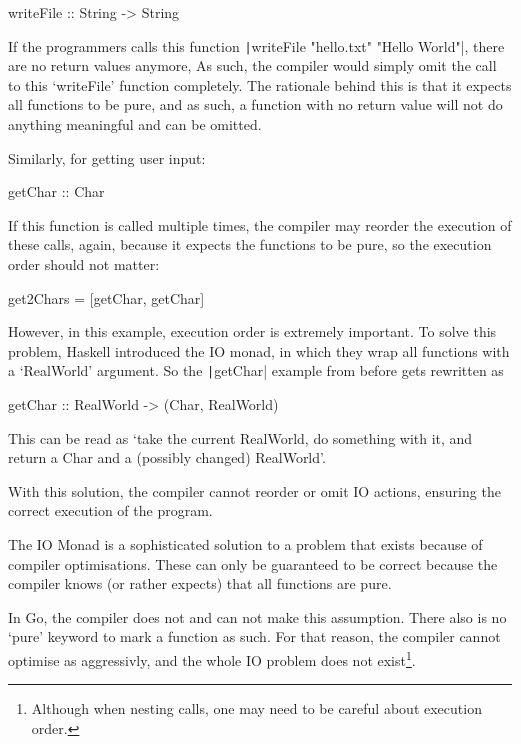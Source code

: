 \begin{haskellcode}
    writeFile :: String -> String
\end{haskellcode}

If the programmers calls this function
\texttt|writeFile "hello.txt" "Hello World"|, there are
no return values anymore, As such, the compiler would simply omit the call
to this `writeFile' function completely. The rationale behind this is that
it expects all functions to be pure, and as such, a function with no return
value will not do anything meaningful and can be omitted.

Similarly, for getting user input:
\begin{haskellcode}
    getChar :: Char
\end{haskellcode}

If this function is called multiple times, the compiler may reorder the
execution of these calls, again, because it expects the functions to be
pure, so the execution order should not matter:
\begin{haskellcode}
    get2Chars = [getChar, getChar]
\end{haskellcode}

However, in this example, execution order is extremely important. To
solve this problem, Haskell introduced the IO monad, in which they
wrap all functions with a `RealWorld' argument. So the
\texttt|getChar| example from before gets rewritten as

\begin{haskellcode}
    getChar :: RealWorld -> (Char, RealWorld)
\end{haskellcode}

This can be read as `take the current RealWorld, do something with it,
and return a Char and a (possibly changed) RealWorld'\autocite{haskell-io}.

With this solution, the compiler cannot reorder or omit IO actions, ensuring
the correct execution of the program.

The IO Monad is a sophisticated solution to a problem that exists because of
compiler optimisations. These can only be guaranteed to be correct because
the compiler knows (or rather expects) that all functions are pure.

In Go, the compiler does not and can not make this assumption. There also
is no `pure' keyword to mark a function as such. For that reason, the
compiler cannot optimise as aggressivly, and the whole IO problem does
not exist\footnote{Although when nesting calls, one may need to be careful about
execution order.}.
